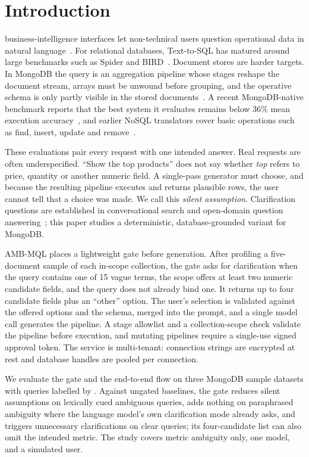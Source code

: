 \section{Introduction}
 business-intelligence interfaces let non-technical users question operational data in natural language~\cite{setlur2016eviza,fast2018iris,quamar2022nli}. For relational databases, Text-to-SQL has matured around large benchmarks such as Spider and BIRD~\cite{spider2018,bird2023}. Document stores are harder targets. In MongoDB the query is an aggregation pipeline whose stages reshape the document stream, arrays must be unwound before grouping, and the operative schema is only partly visible in the stored documents~\cite{mongodb2024manual,tend2025benchmark}. A recent MongoDB-native benchmark reports that the best system it evaluates remains below 36\% mean execution accuracy~\cite{tend2025benchmark}, and earlier NoSQL translators cover basic operations such as find, insert, update and remove~\cite{hossen2023bert}.

These evaluations pair every request with one intended answer. Real requests are often underspecified. ``Show the top products'' does not say whether \emph{top} refers to price, quantity or another numeric field. A single-pass generator must choose, and because the resulting pipeline executes and returns plausible rows, the user cannot tell that a choice was made. We call this \emph{silent assumption}. Clarification questions are established in conversational search and open-domain question answering~\cite{aliannejadi2019asking,zamani2020generating,min2020ambigqa}; this paper studies a deterministic, database-grounded variant for MongoDB.

AMB-MQL places a lightweight gate before generation. After profiling a five-document sample of each in-scope collection, the gate asks for clarification when the query contains one of 15 vague terms, the scope offers at least two numeric candidate fields, and the query does not already bind one. It returns up to four candidate fields plus an ``other'' option. The user's selection is validated against the offered options and the schema, merged into the prompt, and a single model call generates the pipeline. A stage allowlist and a collection-scope check validate the pipeline before execution, and mutating pipelines require a single-use signed approval token. The service is multi-tenant: connection strings are encrypted at rest and database handles are pooled per connection.

We evaluate the gate and the end-to-end flow on three MongoDB sample datasets with \numTotalQueries{} queries labelled by \numAnnotators{}. Against ungated baselines, the gate reduces silent assumptions on lexically cued ambiguous queries, adds nothing on paraphrased ambiguity where the language model's own clarification mode already asks, and triggers unnecessary clarifications on clear queries; its four-candidate list can also omit the intended metric. The study covers metric ambiguity only, one model, and a simulated user.

